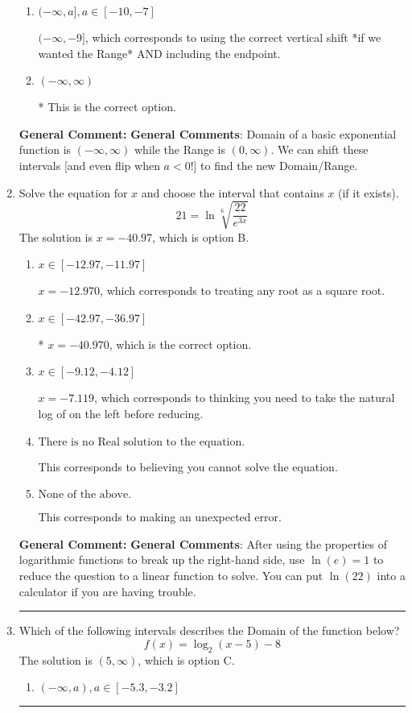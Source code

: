 \documentclass{extbook}[14pt]
\newcommand{\litem}[1]{\item #1

\rule{\textwidth}{0.4pt}}
\begin{document}
\begin{enumerate}
{\begin{enumerate}[label=\Alph*.]
$[9, \infty)$, which corresponds to using the negative vertical shift AND flipping the Range interval AND including the endpoint.
\item \( (-\infty, a], a \in [-10, -7] \)

$(-\infty, -9]$, which corresponds to using the correct vertical shift *if we wanted the Range* AND including the endpoint.
\item \( (-\infty, \infty) \)

* This is the correct option.
\end{enumerate}

\textbf{General Comment:} \textbf{General Comments}: Domain of a basic exponential function is $(-\infty, \infty)$ while the Range is $(0, \infty)$. We can shift these intervals [and even flip when $a<0$!] to find the new Domain/Range.
}
\litem{
 Solve the equation for $x$ and choose the interval that contains $x$ (if it exists).
\[  21 = \ln{\sqrt[6]{\frac{22}{e^{3x}}}} \]The solution is \( x = -40.97 \), which is option B.\begin{enumerate}[label=\Alph*.]
\item \( x \in [-12.97, -11.97] \)

$x = -12.970$, which corresponds to treating any root as a square root.
\item \( x \in [-42.97, -36.97] \)

* $x = -40.970$, which is the correct option.
\item \( x \in [-9.12, -4.12] \)

$x = -7.119$, which corresponds to thinking you need to take the natural log of on the left before reducing.
\item \( \text{There is no Real solution to the equation.} \)

This corresponds to believing you cannot solve the equation.
\item \( \text{None of the above.} \)

This corresponds to making an unexpected error.
\end{enumerate}

\textbf{General Comment:} \textbf{General Comments}: After using the properties of logarithmic functions to break up the right-hand side, use $\ln(e) = 1$ to reduce the question to a linear function to solve. You can put $\ln(22)$ into a calculator if you are having trouble.
}
\litem{
Which of the following intervals describes the Domain of the function below?
\[ f(x) = \log_2{(x-5)}-8 \]The solution is \( (5, \infty) \), which is option C.\begin{enumerate}[label=\Alph*.]
\item \( (-\infty, a), a \in [-5.3, -3.2] \)


\end{enumerate}}
\end{enumerate}
\end{document}
